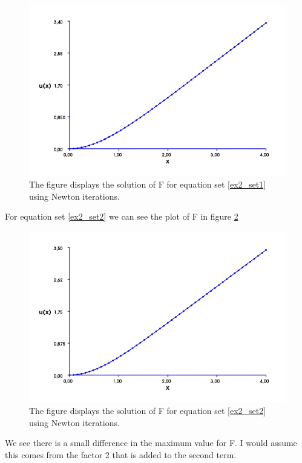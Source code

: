 \documentclass[11pt]{report}
\begin{document}
\begin{figure}[htb]
\includegraphics[scale=0.5]{images/ex2_newton_1.png}
\caption{The figure displays the solution of F for equation set \ref{ex2_set1} using Newton iterations.}
\label{fig:ex2_newton_1}
\end{figure}

For equation set \ref{ex2_set2} we can see the plot of F in figure \ref{fig:ex2_newton_2}

\begin{figure}[htb]
\includegraphics[scale=0.5]{images/ex2_newton_2.png}
\caption{The figure displays the solution of F for equation set \ref{ex2_set2} using Newton iterations.}
\label{fig:ex2_newton_2}
\end{figure}

We see there is a small difference in the maximum value for F. I would assume this comes from the factor 2 that is added to the second term.
\end{document}
